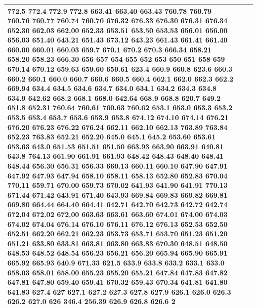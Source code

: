 \documentclass[3p,super,numbers,sort&compress,preprint,10pt]{elsarticle}
\begin{document}
\begin{longtable}{|L{.1in}|L{.6in}||L{5.65in}|}
772.5 772.4 772.9 772.8 663.41 663.40 663.43 760.78 760.79 760.76 760.77 760.74 760.70 676.32 676.33 676.30 676.31 676.34 652.30 662.03 662.00 652.33 653.51 653.50 653.53 656.01 656.00 656.03 651.40 643.21 651.43 673.12 643.23 661.43 661.41 661.40 660.00 660.01 660.03 659.7 670.1 670.2 670.3 666.34 658.21 658.20 658.23 666.30 656 657 654 655 652 653 650 651 658 659 670.14 670.12 659.63 659.60 659.61 623.4 660.9 660.8 623.6 660.3 660.2 660.1 660.0 660.7 660.6 660.5 660.4 662.1 662.0 662.3 662.2 669.94 634.4 634.5 634.6 634.7 634.0 634.1 634.2 634.3 634.8 634.9 642.62 668.2 668.1 668.0 642.64 668.9 668.8 620.7 649.2 651.8 652.31 760.64 760.61 760.63 760.62 653.1 653.0 653.3 653.2 653.5 653.4 653.7 653.6 653.9 653.8 674.12 674.10 674.14 676.21 676.20 676.23 676.22 676.24 662.11 662.10 662.13 763.89 763.84 652.23 763.83 652.21 652.20 645.0 645.1 645.2 653.60 653.61 653.63 643.0 651.53 651.51 651.50 663.93 663.90 663.91 640.81 643.8 764.13 661.90 661.91 661.93 648.42 648.43 648.40 648.41 648.44 656.30 656.31 656.33 660.13 660.11 660.10 647.90 647.91 647.92 647.93 647.94 658.10 658.11 658.13 652.80 652.83 670.04 770.11 659.71 670.00 659.73 670.02 641.93 641.90 641.91 770.13 671.44 671.42 643.91 671.40 643.93 669.84 669.83 669.82 669.81 669.80 664.44 664.40 664.41 642.71 642.70 642.73 642.72 642.74 672.04 672.02 672.00 663.63 663.61 663.60 674.01 674.00 674.03 674.02 674.04 676.14 676.10 676.11 676.12 676.13 652.53 652.50 652.51 662.20 662.21 662.23 653.73 653.71 653.70 651.23 651.20 651.21 633.80 633.81 663.81 663.80 663.83 670.30 648.51 648.50 648.53 648.52 648.54 656.23 656.21 656.20 665.94 665.90 665.91 665.92 665.93 640.9 671.33 621.5 633.9 633.8 633.2 633.1 633.0 658.03 658.01 658.00 655.23 655.20 655.21 647.84 647.83 647.82 647.81 647.80 659.40 659.41 670.32 659.43 670.34 641.81 641.80 641.83 627.4 627 627.1 627.2 627.3 627.8 627.9 626.1 626.0 626.3 626.2 627.0 626 346.4 256.39 626.9 626.8 626.6 2\\\hline

\end{longtable}
\end{document}
